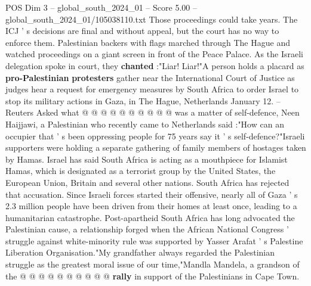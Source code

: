 \begin{textsample}{POS Dim 3 – global\_south\_2024\_01 – Score 5.00 – global\_south\_2024\_01/105038110.txt}
Those proceedings could take years.
The ICJ ' s decisions are final and without appeal, but the court has no way to enforce them.
Palestinian backers with flags marched through The Hague and watched proceedings on a giant screen in front of the Peace Palace.
As the Israeli delegation spoke in court, they \textbf{chanted} :"Liar!
Liar!"A person holds a placard as \textbf{pro-Palestinian} \textbf{protesters} gather near the International Court of Justice as judges hear a request for emergency measures by South Africa to order Israel to stop its military actions in Gaza, in The Hague, Netherlands January 12. -- Reuters Asked what @ @ @ @ @ @ @ @ @ @ was a matter of self-defence, Neen Haijjawi, a Palestinian who recently came to Netherlands said :"How can an occupier that ' s been oppressing people for 75 years say it ' s self-defence?"Israeli supporters were holding a separate gathering of family members of hostages taken by Hamas.
Israel has said South Africa is acting as a mouthpiece for Islamist Hamas, which is designated as a terrorist group by the United States, the European Union, Britain and several other nations.
South Africa has rejected that accusation.
Since Israeli forces started their offensive, nearly all of Gaza ' s 2.3 million people have been driven from their homes at least once, leading to a humanitarian catastrophe.
Post-apartheid South Africa has long advocated the Palestinian cause, a relationship forged when the African National Congress ' struggle against white-minority rule was supported by Yasser Arafat ' s Palestine Liberation Organisation."My grandfather always regarded the Palestinian struggle as the greatest moral issue of our time,"Mandla Mandela, a grandson of the @ @ @ @ @ @ @ @ @ @ \textbf{rally} in support of the Palestinians in Cape Town.

\end{textsample}

